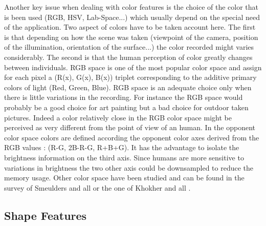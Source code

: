   Another key issue when dealing with color features is the choice of the color that is been used (RGB, HSV, Lab-Space...) which usually depend on the special need of the application. Two aspect of colors have to be taken account here. The first is that depending on how the scene was taken (viewpoint of the camera, position of the illumination, orientation of the surface...) the color recorded might varies considerably. The second is that the human perception of color greatly changes between individuals. RGB space is one of the most popular color space and assign for each pixel a (R(x), G(x), B(x)) triplet corresponding to the additive primary colors of light (Red, Green, Blue). RGB space is an adequate choice only when there is little variations in the recording. For instance the RGB space would probably be a good choice for art painting but a bad choice for outdoor taken pictures. Indeed a color relatively close in the RGB color space might be perceived as very different from the point of view of an human. In the opponent color space colors are defined according the opponent color axes derived from the RGB values : (R-G, 2B-R-G, R+B+G). It has the advantage to isolate the brightness information on the third axis. Since humans are more sensitive to variations in brightness the two other axis could be downsampled to reduce the memory usage. Other color space have been studied and can be found in the survey of Smeulders and all \cite{smeulders2000content} or the one of Khokher and all \cite{khokher2012content}.

  \subsection{Shape Features}

